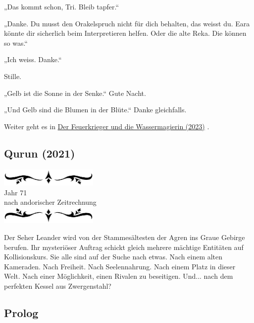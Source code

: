 \documentclass[10pt, a4paper, oneside]{book}
\newcommand{\hypref}[1]{%
    \hyperref[#1]{#1}%
}
\newcommand{\az}[1]{%
    \begin{center}
        \includegraphics[width=180px]{Das Erbe des Wunderkindes/verzierung1.png}\\
        {\Huge #1} \\
        {nach andorischer Zeitrechnung}\\
        \includegraphics[width=180px]{Das Erbe des Wunderkindes/verzierung2.png}
    \end{center}
    \extramarks{}{#1 a.Z.}
}
\begin{document}
„Das kommt schon, Tri. Bleib tapfer.“

„Danke. Du musst den Orakelspruch nicht für dich behalten, das weisst du. Eara könnte dir sicherlich beim Interpretieren helfen. Oder die alte Reka. Die können so was.“

„Ich weiss. Danke.“

Stille.

„Gelb ist die Sonne in der Senke.“ Gute Nacht.

„Und Gelb sind die Blumen in der Blüte.“ Danke gleichfalls.

\begin{center}
    Weiter geht es in \hypref{Der Feuerkrieger und die Wassermagierin (2023)}.
\end{center}



































\begin{chapterbox}
    \chapter{Qurun (2021)}
    \label{Qurun (2021)}
    \az{Jahr 71}
    
    Der Seher Leander wird von der Stammesältesten der Agren ins Graue Gebirge berufen. Ihr mysteriöser Auftrag schickt gleich mehrere mächtige Entitäten auf Kollisionskurs. Sie alle sind auf der Suche nach etwas. Nach einem alten Kameraden. Nach Freiheit. Nach Seelennahrung. Nach einem Platz in dieser Welt. Nach einer Möglichkeit, einen Rivalen zu beseitigen. Und... nach dem perfekten Kessel aus Zwergenstahl?
\end{chapterbox}


\section{Prolog}
\end{document}
